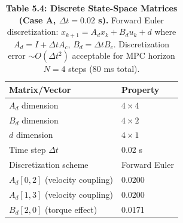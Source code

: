 \begin{table}[H]
\centering
\caption{\textbf{Table 5.4: Discrete State-Space Matrices (Case A, $\Delta t = 0.02$ s).} Forward Euler discretization: $x_{k+1} = A_d x_k + B_d u_k + d$ where $A_d = I + \Delta t A_c$, $B_d = \Delta t B_c$. Discretization error $\sim O(\Delta t^2)$ acceptable for MPC horizon $N = 4$ steps (80 ms total).}
\label{tab:5-4}
\small
\begin{tabular}{ll}
\toprule
\textbf{Matrix/Vector} & \textbf{Property} \\
\midrule
\rowcolor{gray!15}
$A_d$ dimension & $4 \times 4$ \\
$B_d$ dimension & $4 \times 2$ \\
\rowcolor{gray!15}
$d$ dimension & $4 \times 1$ \\
Time step $\Delta t$ & 0.02 s \\
\rowcolor{gray!15}
Discretization scheme & Forward Euler \\
$A_d[0,2]$ (velocity coupling) & 0.0200 \\
\rowcolor{gray!15}
$A_d[1,3]$ (velocity coupling) & 0.0200 \\
$B_d[2,0]$ (torque effect) & 0.0171 \\
\bottomrule
\end{tabular}
\end{table}
